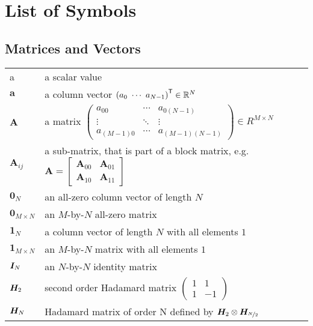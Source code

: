 \chapter*{List of Symbols}
\section*{Matrices and Vectors}
\begin{tabular}{ p{2cm} l }
    a           & a scalar value \\

    $\bm{a}$    & a column vector $\left( a_0 \ \cdots \ a_{N-1} \right)^\mathsf{T} \in \mathbb{R}^{N}$ \\

    $\bm{A}$    & a matrix
    $\begin{pmatrix}
        a_{00} & \cdots & a_{0(N-1)} \\
        \vdots & \ddots & \vdots \\
        a_{(M-1)0} & \cdots & a_{(M-1)(N-1)}
    \end{pmatrix} \in R^{M \times N}
    $ \\
    $\bm{A}_{ij}$ & a sub-matrix, that is part of a block matrix, e.g.
    $\bm{A} =
    \begin{bmatrix}
        \bm{A}_{00} & \bm{A}_{01} \\
        \bm{A}_{10} & \bm{A}_{11}
    \end{bmatrix}
    $ \\

    $\bm{0}_N$  & an all-zero column vector of length $N$ \\
    $\bm{0}_{M \times N}$    & an $M$-by-$N$ all-zero matrix \\
    $\bm{1}_N$  & a column vector of length $N$ with all elements $1$ \\
    $\bm{1}_{M \times N}$    & an $M$-by-$N$ matrix with all elements $1$ \\

    $\bm{I}_{N}$  & an $N$-by-$N$ identity matrix \\

    $\bm{H_}{2}$    & second order Hadamard matrix
    $
    \begin{pmatrix}
        1 & 1 \\
        1 & -1
    \end{pmatrix}
    $ \\

    $\bm{H_}{N}$    & Hadamard matrix of order N defined by $\bm{H_}{2} \otimes \bm{H_}{\nicefrac{N}{2}}$ \\


\end{tabular}
